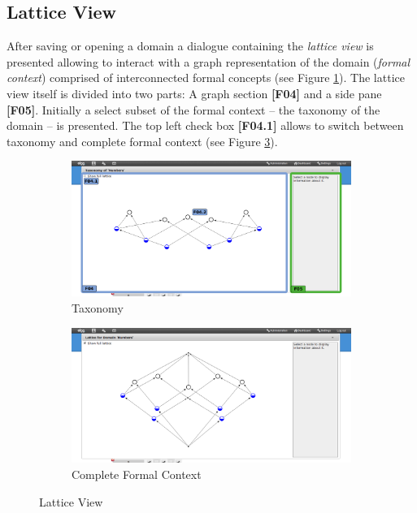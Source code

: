 \documentclass[a4paper,11pt]{article}
\begin{document}
\subsection{Lattice View}
After saving or opening a domain a dialogue containing the \emph{lattice view} is presented allowing to interact with a graph representation of the domain (\emph{formal context}) comprised of interconnected formal concepts (see Figure \ref{fig:fca-lattice-view}). The lattice view itself is divided into two parts: A graph section \textbf{[F04]} and a side pane \textbf{[F05]}. Initially a select subset of the formal context -- the taxonomy of the domain -- is presented. The top left check box \textbf{[F04.1]} allows to switch between taxonomy and complete formal context (see Figure \ref{fig:fca-lattice}).
\begin{figure}[h]
\begin{center}
  \begin{subfigure}{0.8 \textwidth}
    \begin{center}
    \includegraphics[width=\textwidth]{figures/taxonomy_show}
    \caption{Taxonomy}
    \label{fig:fca-lattice-view}
    \end{center}
  \end{subfigure}
  \begin{subfigure}{0.8 \textwidth}
    \begin{center}
    \includegraphics[width=\textwidth]{figures/lattice}
    \caption{Complete Formal Context}
    \label{fig:fca-lattice}
    \end{center}
  \end{subfigure}
\end{center}
\caption{Lattice View}
\end{figure}
\end{document}
